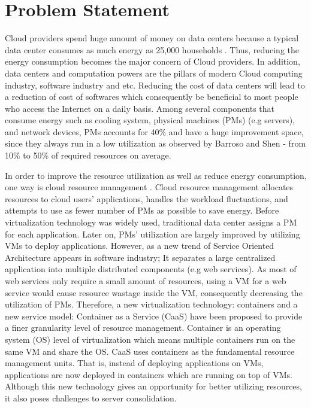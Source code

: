 \section{Problem Statement}

Cloud providers spend huge amount of money on data centers because a typical data center consumes as much energy as 25,000 households \cite{Dayarathna:2016ua}. Thus, reducing the energy consumption becomes the major concern of Cloud providers. 
In addition, data centers and computation powers are the pillars of modern Cloud computing industry, software industry and etc. Reducing the cost of data centers will lead to a reduction of cost of softwares which consequently be beneficial to most people who access the Internet on a daily basis.
Among several components that consume energy such as cooling system, physical machines (PMs) (e.g servers), and network devices, PMs accounts for 40\% and have a huge improvement space, since they always run in a low utilization as observed by Barroso and Shen \cite{Barroso:2007jt,Shen:2015hm} - from 10\% to 50\% of required resources on average. 

In order to improve the resource utilization as well as reduce energy consumption, one way is cloud resource management \cite{Manvi:2014hm}. Cloud resource management allocates resources to cloud users' applications, handles the workload fluctuations, and attempts to use as fewer number of PMs as possible to save energy. Before virtualization technology \cite{Uhlig:2005do}  was widely used, traditional data center assigns a PM for each application. Later on, PMs' utilization are largely improved by utilizing VMs to deploy applications. However, as a new trend of Service Oriented Architecture \cite{Sprott:2004wt} appears in software industry; It separates a large centralized application into multiple distributed components (e.g web services). As most of web services only require a small amount of resources,  using a VM for a web service would cause resource wastage inside the VM, consequently decreasing the utilization of PMs. Therefore, a new virtualization technology: containers \cite{Felter:2015ki, Soltesz:2007cu} and a new service model: Container as a Service (CaaS) \cite{Piraghaj:2015uf} have been proposed to provide a finer granularity level of resource management. Container is an operating system (OS) level of virtualization which means multiple containers  run on the same VM and share the OS. CaaS uses containers as the fundamental resource management units.  That is, instead of deploying applications on VMs, applications are now deployed in containers which are running on top of VMs. Although this new technology gives an opportunity for better utilizing resources, it also poses challenges to server consolidation. 


